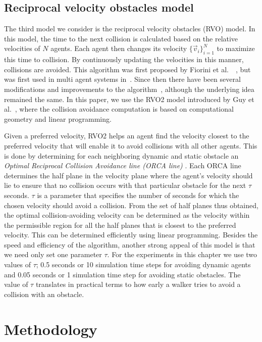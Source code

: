 \subsection{Reciprocal velocity obstacles model}
\label{RVOModel}

The third model we consider is the reciprocal velocity obstacles (RVO) model. In this model, the time to the next collision is calculated based on the relative velocities of $N$ agents. Each agent then changes its velocity $\{\vec{v}_i\}_{i=1}^N$ to maximize this time to collision. By continuously updating the velocities in this manner, collisions are avoided. This algorithm was first proposed by Fiorini et al.~~\cite{Fiorini:1993hi}, but was first used in multi agent systems in~\cite{vandenBerg:2008cq}. Since then there have been several modifications and improvements to the algorithm~\cite{Guy:2009gu,Guy:2010ko,Guy:2010te,Guy:2010uv}, although the underlying idea remained the same. In this paper, we use the RVO2 model introduced by Guy et al.~\cite{Guy:2010ko}, where the collision avoidance computation is based on computational geometry and linear programming.

Given a preferred velocity, RVO2 helps an agent find the velocity closest to the preferred velocity that will enable it to avoid collisions with all other agents. This is done by determining for each neighboring dynamic and static obstacle an \emph{Optimal Reciprocal Collision Avoidance line (ORCA line) }. Each ORCA line determines the half plane in the velocity plane where the agent's velocity should lie to ensure that no collision occurs with that particular obstacle for the next $\tau$ seconds. $\tau$ is a parameter that specifies the number of seconds for which the chosen velocity should avoid a collision. From the set of half planes thus obtained, the optimal collision-avoiding velocity can be determined as the velocity within the permissible region for all the half planes that is closest to the preferred velocity. This can be determined efficiently using linear programming. Besides the speed and efficiency of the algorithm, another strong appeal of this model is that we need only set one parameter $\tau$. For the experiments in this chapter we use two values of $\tau$;  0.5 seconds or 10 simulation time steps for avoiding dynamic agents and  0.05 seconds or 1 simulation time step for avoiding static obstacles. The value of $\tau$ translates in practical terms to how early a walker tries to avoid a collision with an obstacle.


\section{Methodology}
\label{Methodology}

